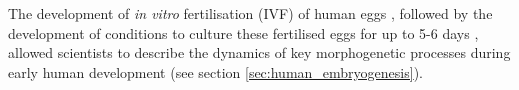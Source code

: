 The development of \textit{in vitro} fertilisation (IVF) of human eggs \cite{edwards1969early, rock1944vitro, shettles1955morula}, followed by the development of conditions to culture these fertilised eggs for up to 5-6 days \cite{edwards1970fertilization, steptoe1971human},
allowed scientists to describe the dynamics of key morphogenetic processes during early human development (see section \ref{sec:human_embryogenesis}).
\\



